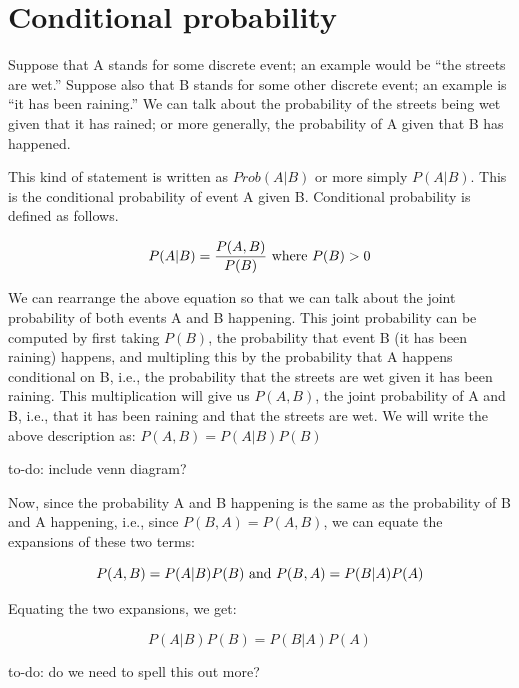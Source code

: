 \documentclass[12pt,]{krantz}
\theoremstyle{definition}
\theoremstyle{definition}
\theoremstyle{definition}
\theoremstyle{remark}
\let\BeginKnitrBlock\begin \let\EndKnitrBlock\end
\begin{document}
\hypertarget{conditional-probability}{%
\section{Conditional probability}\label{conditional-probability}}

Suppose that A stands for some discrete event; an example would be ``the streets are wet.'' Suppose also that B stands for some other discrete event; an example is ``it has been raining.'' We can talk about the probability of the streets being wet given that it has rained; or more generally, the probability of A given that B has happened.

This kind of statement is written as \(Prob(A|B)\) or more simply \(P(A|B)\). This is the conditional probability of event A given B. Conditional probability is defined as follows.

\begin{equation} 
P(A|B)= \frac{P(A,B)}{P(B)} \hbox{ where } P(B)>0
\end{equation}

We can rearrange the above equation so that we can talk about the joint probability of both events A and B happening. This joint probability can be computed by first taking \(P(B)\), the probability that event B (it has been raining) happens, and multipling this by the probability that A happens conditional on B, i.e., the probability that the streets are wet given it has been raining. This multiplication will give us \(P(A,B)\), the joint probability of A and B, i.e., that it has been raining and that the streets are wet. We will write the above description as: \(P(A,B)=P(A|B)P(B)\)

\BeginKnitrBlock{rmdnote}
to-do: include venn diagram?
\EndKnitrBlock{rmdnote}

Now, since the probability A and B happening is the same as the probability of B and A happening, i.e., since \(P(B,A)=P(A,B)\), we can equate the expansions of these two terms:

\begin{equation}
P(A,B) = P(A|B) P(B) \hbox{ and } P(B,A) = P(B|A)P(A) 
\end{equation}

Equating the two expansions, we get:

\begin{equation}
P(A|B) P(B) = P(B|A)P(A) 
\end{equation}

\BeginKnitrBlock{rmdnote}
to-do: do we need to spell this out more?
\EndKnitrBlock{rmdnote}
\end{document}

